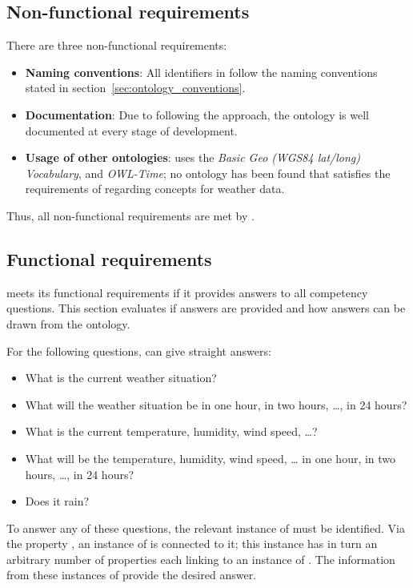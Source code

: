 \subsection{Non-functional requirements}
\label{sec:evaluation_non_functional}

There are three non-functional requirements:

\begin{itemize}
  \item \textbf{Naming conventions}: All identifiers in \thinkhomeweather follow the naming conventions stated in section~\ref{sec:ontology_conventions}.
  \item \textbf{Documentation}: Due to following the \methontology approach, the ontology is well documented at every stage of development.
  \item \textbf{Usage of other ontologies}: \thinkhomeweather uses the \emph{Basic Geo (WGS84 lat/long) Vocabulary}, \muo and \emph{OWL-Time}; no ontology has been found that satisfies the requirements of \thinkhomeweather regarding concepts for weather data.
\end{itemize}

Thus, all non-functional requirements are met by \thinkhomeweather.

\subsection{Functional requirements}
\label{sec:evaluation_functional}

\thinkhomeweather meets its functional requirements if it provides answers to all competency questions. This section evaluates if answers are provided and how answers can be drawn from the ontology.

For the following questions, \thinkhomeweather can give straight answers:
\begin{itemize}
  \item What is the current weather situation?
  \item What will the weather situation be in one hour, in two hours, …, in 24 hours?
  \item What is the current temperature, humidity, wind speed, …?
  \item What will be the temperature, humidity, wind speed, … in one hour, in two hours, …, in 24 hours?
  \item Does it rain?
\end{itemize}
To answer any of these questions, the relevant instance of  must be identified. Via the property , an instance of  is connected to it; this instance has in turn an arbitrary number of  properties each linking to an instance of . The information from these instances of  provide the desired answer.


